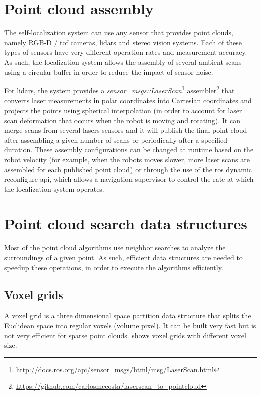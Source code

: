 \section{Point cloud assembly}

The self-localization system can use any sensor that provides point clouds, namely RGB-D / \gls{tof} cameras, \glspl{lidar} and stereo vision systems. Each of these types of sensors have very different operation rates and measurement accuracy. As such, the localization system allows the assembly of several ambient scans using a circular buffer in order to reduce the impact of sensor noise.

For \glspl{lidar}, the system provides a \emph{sensor\_msgs::LaserScan}\footnote{\url{http://docs.ros.org/api/sensor_msgs/html/msg/LaserScan.html}} assembler\footnote{\url{https://github.com/carlosmccosta/laserscan_to_pointcloud}} that converts laser measurements in polar coordinates into Cartesian coordinates and projects the points using spherical interpolation (in order to account for laser scan deformation that occurs when the robot is moving and rotating). It can merge scans from several lasers sensors and it will publish the final point cloud after assembling a given number of scans or periodically after a specified duration. These assembly configurations can be changed at runtime based on the robot velocity (for example, when the robots moves slower, more laser scans are assembled for each published point cloud) or through the use of the \gls{ros} dynamic reconfigure \gls{api}, which allows a navigation supervisor to control the rate at which the localization system operates.



\section{Point cloud search data structures}

Most of the point cloud algorithms use neighbor searches to analyze the surroundings of a given point. As such, efficient data structures are needed to speedup these operations, in order to execute the algorithms efficiently.


\subsection{Voxel grids}

A voxel grid is a three dimensional space partition data structure that splits the Euclidean space into regular voxels (volume pixel). It can be built very fast but is not very efficient for sparse point clouds.  shows voxel grids with different voxel size.

